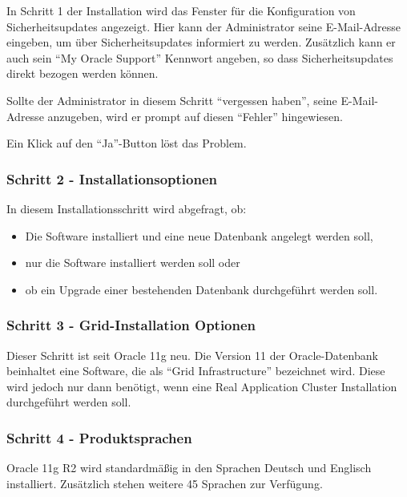 \clearpage
          In Schritt 1  der Installation wird das Fenster für die Konfiguration von Sicherheitsupdates angezeigt. Hier kann der Administrator seine E-Mail-Adresse eingeben, um über Sicherheitsupdates informiert zu werden. Zusätzlich kann er auch sein \enquote{My Oracle Support} Kennwort angeben, so dass Sicherheitsupdates direkt bezogen werden können.

          Sollte der Administrator in diesem Schritt \enquote{vergessen haben}, seine E-Mail-Adresse anzugeben, wird er prompt auf diesen \enquote{Fehler} hingewiesen.

          Ein Klick auf den \enquote{Ja}-Button löst das Problem.

        \subsubsection{Schritt 2 - Installationsoptionen}
          In diesem Installationsschritt wird abgefragt, ob:
          \begin{itemize}
            \item Die Software installiert und eine neue Datenbank angelegt werden soll,
            \item nur die Software installiert werden soll oder
            \item ob ein Upgrade einer bestehenden Datenbank durchgeführt werden soll.
          \end{itemize}
        \subsubsection{Schritt 3 - Grid-Installation Optionen}
          Dieser Schritt ist seit Oracle 11g neu. Die Version 11 der Oracle-Datenbank beinhaltet eine Software, die als \enquote{Grid Infrastructure} bezeichnet wird. Diese wird jedoch nur dann benötigt, wenn eine Real Application Cluster Installation durchgeführt werden soll.
        \subsubsection{Schritt 4 - Produktsprachen}
          Oracle 11g R2 wird standardmäßig in den Sprachen Deutsch und Englisch installiert. Zusätzlich stehen weitere 45 Sprachen zur Verfügung.

